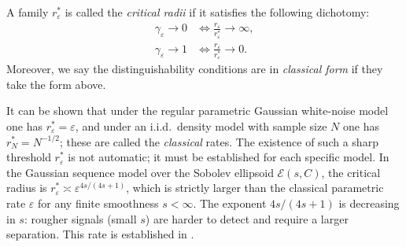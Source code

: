 \begin{definition}
\label{def:critical-radii}
A family $r_\varepsilon^*$ is called the \emph{critical radii} if it satisfies the following
dichotomy:
\begin{align*}
  \gamma_\varepsilon \to 0 &\iff \frac{r_\varepsilon}{r_\varepsilon^*} \to \infty, \\
  \gamma_\varepsilon \to 1 &\iff \frac{r_\varepsilon}{r_\varepsilon^*} \to 0.
\end{align*}
Moreover, we say the distinguishability conditions are in \emph{classical form} if they take the
form above.
\end{definition}

\begin{remark}
It can be shown that under the regular parametric Gaussian white-noise model one has $r_\varepsilon^* = \varepsilon$,
and under an i.i.d.\ density model with sample size $N$ one has $r_N^* = N^{-1/2}$; these are
called the \emph{classical} rates.
The existence of such a sharp threshold $r_\varepsilon^*$ is not automatic; it must be established
for each specific model. In the Gaussian sequence model over the Sobolev ellipsoid $\mathcal{E}(s,C)$,
the critical radius is $r_\varepsilon^* \asymp \varepsilon^{4s/(4s+1)}$, which is strictly larger than
the classical parametric rate $\varepsilon$ for any finite smoothness $s < \infty$. The exponent
$4s/(4s+1)$ is decreasing in $s$: rougher signals (small $s$) are harder to detect and require
a larger separation. This rate is established in \citet{Ing2012}.
\end{remark}
